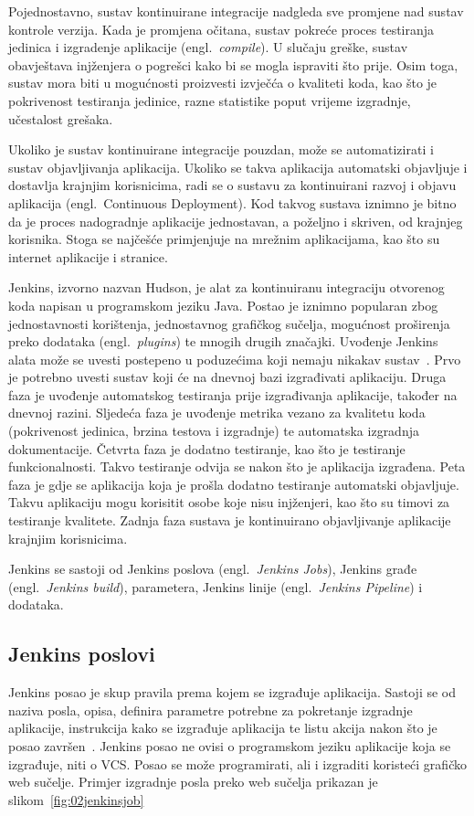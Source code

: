 Pojednostavno, sustav kontinuirane integracije nadgleda sve promjene nad sustav kontrole verzija.
Kada je promjena očitana, sustav pokreće proces testiranja jedinica i izgradenje aplikacije
(engl.~\textit{compile}). U slučaju greške, sustav obavještava injženjera o pogrešci kako bi se
mogla ispraviti što prije. Osim toga, sustav mora biti u mogućnosti proizvesti izvječća o
kvaliteti koda, kao što je pokrivenost testiranja jedinice, razne statistike poput vrijeme
izgradnje, učestalost grešaka.

Ukoliko je sustav kontinuirane integracije pouzdan, može se automatizirati i sustav objavljivanja
aplikacija. Ukoliko se takva aplikacija automatski objavljuje i dostavlja krajnjim korisnicima, radi
se o sustavu za kontinuirani razvoj i objavu aplikacija (engl.~Continuous Deployment). Kod takvog
sustava iznimno je bitno da je proces nadogradnje aplikacije jednostavan, a poželjno i skriven, od
krajnjeg korisnika. Stoga se najčešće primjenjuje na mrežnim aplikacijama, kao što su internet
aplikacije i stranice.

Jenkins, izvorno nazvan Hudson, je alat za kontinuiranu integraciju otvorenog koda napisan u
programskom jeziku Java. Postao je iznimno popularan zbog jednostavnosti korištenja, jednostavnog
grafičkog sučelja, mogućnost proširenja preko dodataka (engl.~\textit{plugins}) te mnogih drugih
značajki. Uvođenje Jenkins alata može se uvesti postepeno u poduzećima koji nemaju nikakav
sustav~\citep{smart2011jenkins}. Prvo je potrebno uvesti sustav koji će na dnevnoj bazi izgrađivati
aplikaciju. Druga faza je uvođenje automatskog testiranja prije izgrađivanja aplikacije, također na
dnevnoj razini. Sljedeća faza je uvođenje metrika vezano za kvalitetu koda (pokrivenost jedinica,
brzina testova i izgradnje) te automatska izgradnja dokumentacije. Četvrta faza je dodatno
testiranje, kao što je testiranje funkcionalnosti. Takvo testiranje odvija se nakon što je
aplikacija izgrađena. Peta faza je gdje se aplikacija koja je prošla dodatno testiranje automatski
objavljuje. Takvu aplikaciju mogu korisitit osobe koje nisu injženjeri, kao što su timovi za
testiranje kvalitete. Zadnja faza sustava je kontinuirano objavljivanje aplikacije krajnjim
korisnicima.

Jenkins se sastoji od Jenkins poslova (engl.~\textit{Jenkins Jobs}), Jenkins građe
(engl.~\textit{Jenkins build}), %
parametera, Jenkins linije (engl.~\textit{Jenkins Pipeline}) i dodataka.

\subsection{Jenkins poslovi}
Jenkins posao je skup pravila prema kojem se izgrađuje aplikacija. Sastoji se od naziva posla,
opisa, definira parametre potrebne za pokretanje izgradnje aplikacije, instrukcija kako se izgrađuje
aplikacija te listu akcija nakon što je posao završen~\citep{pathania2016learning}. Jenkins posao ne
ovisi o programskom jeziku aplikacije koja se izgrađuje, niti o VCS. Posao se može programirati, ali
i izgraditi koristeći grafičko web sučelje. Primjer izgradnje posla preko web sučelja prikazan je
slikom~\ref{fig:02jenkinsjob}

